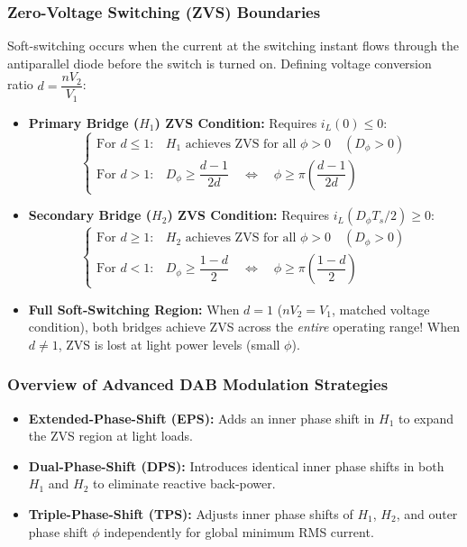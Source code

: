 \subsubsection{Zero-Voltage Switching (ZVS) Boundaries}
Soft-switching occurs when the current at the switching instant flows through the antiparallel diode before the switch is turned on.
Defining voltage conversion ratio $d = \dfrac{n V_2}{V_1}$:
\begin{itemize}
  \item \textbf{Primary Bridge ($H_1$) ZVS Condition:} Requires $i_L(0) \le 0$:
  \begin{equation}
  \begin{cases}
  \text{For } d \le 1: & H_1 \text{ achieves ZVS for all } \phi > 0 \quad (D_\phi > 0) \\[4pt]
  \text{For } d > 1: & D_\phi \ge \dfrac{d - 1}{2d} \quad\iff\quad \phi \ge \pi \left(\dfrac{d - 1}{2d}\right)
  \end{cases}
  \end{equation}
  \item \textbf{Secondary Bridge ($H_2$) ZVS Condition:} Requires $i_L(D_\phi T_s/2) \ge 0$:
  \begin{equation}
  \begin{cases}
  \text{For } d \ge 1: & H_2 \text{ achieves ZVS for all } \phi > 0 \quad (D_\phi > 0) \\[4pt]
  \text{For } d < 1: & D_\phi \ge \dfrac{1 - d}{2} \quad\iff\quad \phi \ge \pi \left(\dfrac{1 - d}{2}\right)
  \end{cases}
  \end{equation}
  \item \textbf{Full Soft-Switching Region:} When $d = 1$ ($n V_2 = V_1$, matched voltage condition), both bridges achieve ZVS across the \emph{entire} operating range! When $d \neq 1$, ZVS is lost at light power levels (small $\phi$).
\end{itemize}

\subsubsection{Overview of Advanced DAB Modulation Strategies}
\begin{itemize}
  \item \textbf{Extended-Phase-Shift (EPS):} Adds an inner phase shift in $H_1$ to expand the ZVS region at light loads.
  \item \textbf{Dual-Phase-Shift (DPS):} Introduces identical inner phase shifts in both $H_1$ and $H_2$ to eliminate reactive back-power.
  \item \textbf{Triple-Phase-Shift (TPS):} Adjusts inner phase shifts of $H_1$, $H_2$, and outer phase shift $\phi$ independently for global minimum RMS current.
\end{itemize}


